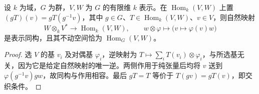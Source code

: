 \begin{proposition}\label{b5:prop:hom-tensor-invariants}
	设 \(k\) 为域，\(G\) 为群，\(V,W\) 为 \(G\) 的有限维 \(k\) 表示。在 \(\operatorname{Hom}_k(V,W)\) 上置 \((gT)(v)=gT(g^{-1}v)\)，其中 \(g\in G\)、\(T\in\operatorname{Hom}_k(V,W)\)、\(v\in V\)，则自然映射
	\[
		W\otimes_kV^*\longrightarrow\operatorname{Hom}_k(V,W), \qquad w\otimes\varphi\longmapsto\bigl(v\mapsto\varphi(v)w\bigr)
	\]
	是表示同构，且其不动空间恰为 \(\operatorname{Hom}_G(V,W)\)。
\end{proposition}
\begin{proof}
	选 \(V\) 的基 \(v_i\) 及对偶基 \(\varphi_i\)，逆映射为 \(T\mapsto\sum_iT(v_i)\otimes\varphi_i\)，与所选基无关，因为它是给定自然映射的唯一逆。两侧作用于纯张量后均将 \(v\) 送到 \(\varphi(g^{-1}v)gw\)，故同构与作用相容。最后 \(gT=T\) 等价于 \(T(gv)=gT(v)\)，即交织条件。
\end{proof}
